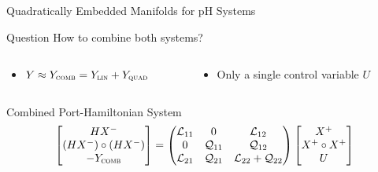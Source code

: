 \begin{frame}{Quadratically Embedded Manifolds for pH Systems}
    \begin{alertblock}{Question}
        How to combine both systems?
    \end{alertblock}

    \begin{columns}
        \begin{column}{.35\textwidth}
            \begin{itemize}
                \item $Y \approx Y_{\textsc{comb}} = Y_{\textsc{lin}} + Y_{\textsc{quad}}$
            \end{itemize}
        \end{column}
        \begin{column}{.4\textwidth}
            \begin{itemize}
                \item Only a single control variable $U$
            \end{itemize}
        \end{column}
    \end{columns}

    \begin{block}{Combined Port-Hamiltonian System}
        \begin{equation*}
            \begin{bmatrix}
                H X^- \\
                (H X^-) \circ (H X^-) \\
                - Y_{\textsc{comb}}
            \end{bmatrix} = \begin{pmatrix}
                \mathcal{L}_{11} & 0 & \mathcal{L}_{12} \\
                0 & \mathcal{Q}_{11} & \mathcal{Q}_{12} \\
                \mathcal{L}_{21} & \mathcal{Q}_{21} & \mathcal{L}_{22} + \mathcal{Q}_{22}
            \end{pmatrix} \begin{bmatrix}
                X^+ \\
                X^+ \circ X^+ \\
                U
            \end{bmatrix}
        \end{equation*}
    \end{block}
\end{frame}